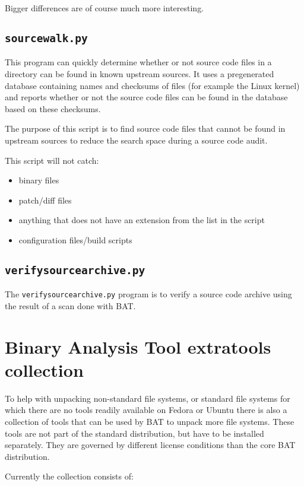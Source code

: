 \documentclass[10pt]{article}
\begin{document}
Bigger differences are of course much more interesting.

\subsection{\texttt{sourcewalk.py}}

This program can quickly determine whether or not source code files in a
directory can be found in known upstream sources. It uses a pregenerated
database containing names and checksums of files (for example the Linux kernel)
and reports whether or not the source code files can be found in the database
based on these checksums.

The purpose of this script is to find source code files that cannot be found in
upstream sources to reduce the search space during a source code audit.

This script will not catch:

\begin{itemize}
\item binary files
\item patch/diff files
\item anything that does not have an extension from the list in the script
\item configuration files/build scripts
\end{itemize}

\subsection{\texttt{verifysourcearchive.py}}

The \texttt{verifysourcearchive.py} program is to verify a source code archive
using the result of a scan done with BAT.

\section{Binary Analysis Tool extratools collection}

To help with unpacking non-standard file systems, or standard file systems for
which there are no tools readily available on Fedora or Ubuntu there is also
a collection of tools that can be used by BAT to unpack more file systems.
These tools are not part of the standard distribution, but have to be installed
separately. They are governed by different license conditions than the core BAT
distribution.

Currently the collection consists of:
\end{document}
